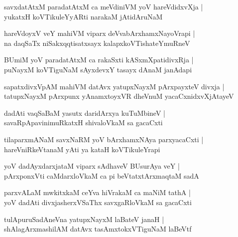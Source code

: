 \begin{shloka}
savxdatAtxM paradatAtxM ca meVdiniVM yoV hareVdidxvXja |\\
yukatxH koVTikuleYyARti narakaM jAtidAruNaM 
\end{shloka}

\begin{shloka}
hareVdoyxV veY mahiVM viparx deVvabArxhamxNayoVrapi |\\
na daqSaTx niSakxqqtisatxsayx kalapxkoVTishateYmuRneV 
\end{shloka}

\begin{shloka}
BUmiM yoV paradatAtxM ca rakaSxti kASxmXpatidivxRja |\\
puNayxM koVTiguNaM sAyxdevxY tasayx dAnaM janAdapi
\end{shloka}

\begin{shloka}
sapatxdivxVpAM mahiVM datAvx yatupxNayxM pArxpayxteV divxja |\\
tatupxNayxM pArxpunx yAnamxtoyxVR dheVnuM yacaCxnidxvXjAtayeV 
\end{shloka}

\begin{shloka}
dadAti vaqSaBaM yasutx daridArxya kuTuMbineV |\\
savaRpApavinimuRkatxH shivaloVkaM sa gacaCxti
\end{shloka}

\begin{shloka}
tilaparxmANaM savxNaRM yoV bArxhamxNAya parxyacaCxti |\\
hareVniRkeVtanaM yAti ya kataH koVTikuleYrapi
\end{shloka}

\begin{shloka}
yoV dadAyxdarxjataM viparx sAdhaveV BUsurAya veY |\\
pArxponxVti caMdarxloVkaM ca pi beVtatxtArxmaqtaM sadA
\end{shloka}

\begin{shloka}
parxvALaM mwkitxkaM ceYva hiVrakaM ca maNiM tathA |\\
yoV dadAti divxjasherxVSaThx savxgaRloVkaM sa gacaCxti
\end{shloka}

\begin{shloka}
tulApuruSadAneVna yatupxNayxM laBateV janaH |\\
shAlagArxmashilAM datAvx tasAmxtokxVTiguNaM laBeVtf
\end{shloka}

